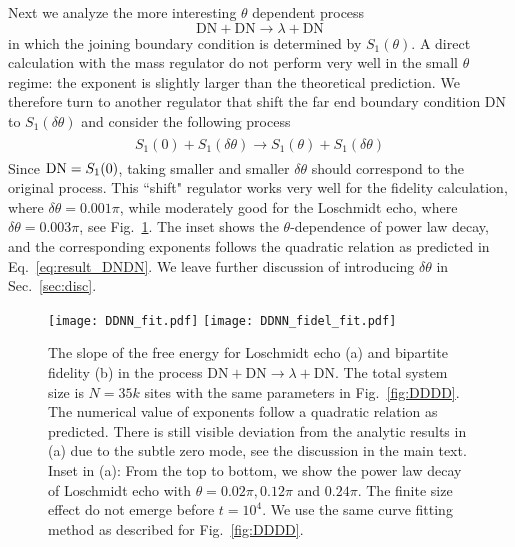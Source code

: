 Next we analyze the more interesting $\theta$ dependent process
\begin{equation}
  \text{DN}+\text{DN}\rightarrow\lambda+\text{DN}
\end{equation}
in which the joining boundary condition is determined by $S_1(\theta)$. A direct calculation with the mass regulator do not perform very well in the small $\theta$ regime: the exponent is slightly larger than the theoretical prediction. We therefore turn to another regulator that shift the far end boundary condition DN to $S_1( \delta \theta )$ and consider the following process
\begin{eqnarray}\begin{aligned}
\label{eq:approx_DNDN}
S_1(0)+S_1(\delta\theta)\rightarrow S_1(\theta)+S_1(\delta\theta)
\end{aligned}\end{eqnarray}
Since ${\rm DN} = S_1 (0 )$, taking smaller and smaller $\delta \theta$ should correspond to the original process. This ``shift" regulator works very well for the fidelity calculation, where $\delta \theta = 0.001 \pi$, while moderately good for the Loschmidt echo, where $\delta \theta = 0.003\pi$, see Fig.~\ref{fig:DDNN}. The inset shows the $\theta$-dependence of power law decay, and the corresponding exponents follows the quadratic relation as predicted in Eq.~\eqref{eq:result_DNDN}. We leave further discussion of introducing $\delta\theta$ in Sec.~\ref{sec:disc}. 

\begin{figure}
  \centering
\texttt{[image: DDNN\_fit.pdf]}
\texttt{[image: DDNN\_fidel\_fit.pdf]}
    \caption{The slope of the free energy for Loschmidt echo (a) and bipartite fidelity (b) in the process $\text{DN}+\text{DN}\rightarrow\lambda+\text{DN}$. The total system size is $N=35k$ sites with the same parameters in Fig.~\ref{fig:DDDD}. The numerical value of exponents follow a quadratic relation as predicted. There is still visible deviation from the analytic results in (a) due to the subtle zero mode, see the discussion in the main text. Inset in (a): From the top to bottom, we show the power law decay of Loschmidt echo with $\theta=0.02\pi, 0.12\pi $ and $0.24\pi$. The finite size effect do not emerge before $t=10^{4}$. We use the same curve fitting method as described for Fig.~\ref{fig:DDDD}.}
      \label{fig:DDNN}
\end{figure}

